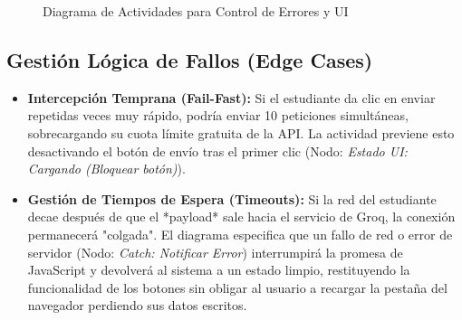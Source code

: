 \begin{figure}[ht]
\caption{Diagrama de Actividades para Control de Errores y UI}
\label{fig:actividades}
\end{figure}

\subsection{Gestión Lógica de Fallos (Edge Cases)}
\begin{itemize}
    \item \textbf{Intercepción Temprana (Fail-Fast):} Si el estudiante da clic en enviar repetidas veces muy rápido, podría enviar 10 peticiones simultáneas, sobrecargando su cuota límite gratuita de la API. La actividad previene esto desactivando el botón de envío tras el primer clic (Nodo: \textit{Estado UI: Cargando (Bloquear botón)}).
    \item \textbf{Gestión de Tiempos de Espera (Timeouts):} Si la red del estudiante decae después de que el *payload* sale hacia el servicio de Groq, la conexión permanecerá "colgada". El diagrama especifica que un fallo de red o error de servidor (Nodo: \textit{Catch: Notificar Error}) interrumpirá la promesa de JavaScript y devolverá al sistema a un estado limpio, restituyendo la funcionalidad de los botones sin obligar al usuario a recargar la pestaña del navegador perdiendo sus datos escritos.
\end{itemize}
